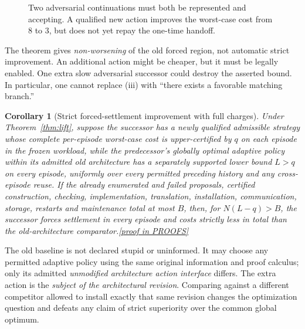 \documentclass[11pt,letterpaper]{article}
\newtheorem{corollary}[theorem]{Corollary}
\theoremstyle{definition}
\theoremstyle{remark}
\newcommand{\prooflink}[1]{\hfill\hyperlink{proof:#1}{\footnotesize[proof in PROOFS]}}
\begin{document}
\begin{figure}[htbp]\centering
{}
\caption{Two adversarial continuations must both be represented and accepting. A qualified new action improves the worst-case cost from $8$ to $3$, but does not yet repay the one-time handoff.}\end{figure}

The theorem gives \emph{non-worsening} of the old forced region, not automatic strict improvement. An additional action might be cheaper, but it must be legally enabled. One extra slow adversarial successor could destroy the asserted bound. In particular, one cannot replace (iii) with ``there exists a favorable matching branch.''

\begin{corollary}[Strict forced-settlement improvement with full charges]\label{cor:strict}\hypertarget{claim:strict}{}
Under Theorem~\ref{thm:lift}, suppose the successor has a newly qualified admissible strategy whose complete per-episode worst-case cost is \emph{upper-certified} by $q$ on each episode in the frozen workload, while the predecessor's globally optimal adaptive policy \emph{within its admitted old architecture} has a separately supported lower bound $L>q$ on every episode, uniformly over every permitted preceding history and any cross-episode reuse. If the already enumerated and failed proposals, certified construction, checking, implementation, translation, installation, communication, storage, restarts and maintenance total at most $B$, then, for $N(L-q)>B$, the successor forces settlement in every episode and costs strictly less in total than the old-architecture comparator.\prooflink{strict}
\end{corollary}

The old baseline is not declared stupid or uninformed. It may choose any permitted adaptive policy using the same original information and proof calculus; only its admitted \emph{unmodified architecture action interface} differs. The extra action is the \emph{subject of the architectural revision}. Comparing against a different competitor allowed to install exactly that same revision changes the optimization question and defeats any claim of strict superiority over the common global optimum.
\end{document}

